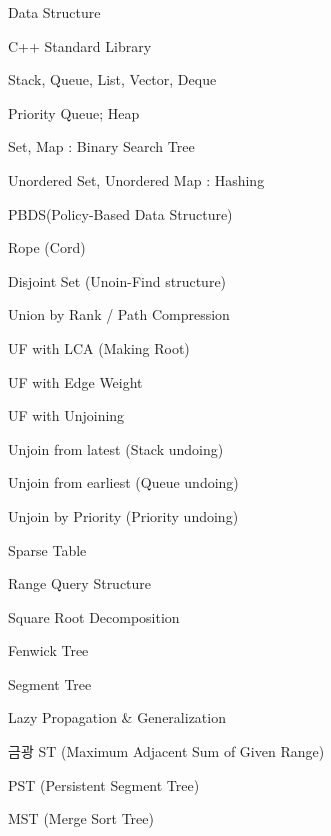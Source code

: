 \documentclass[landscape, 8pt, a4paper, oneside]{extarticle}
\begin{document}
\begin{multicols}{3}
\begin{tcolorbox}[breakable, enhanced, sharp corners, colback=white, colframe=black, boxrule=1pt, left=0pt]
\begin{IdeaNote}
\item Data Structure
    \begin{IdeaNote}
    \item C++ Standard Library
        \begin{IdeaNote}
        \item Stack, Queue, List, Vector, Deque
        \item Priority Queue; Heap
        \item Set, Map : Binary Search Tree
        \item Unordered Set, Unordered Map : Hashing
        \item PBDS(Policy-Based Data Structure)
        \item Rope (Cord)
        \end{IdeaNote}
    \item Disjoint Set (Unoin-Find structure)
        \begin{IdeaNote}
        \item Union by Rank / Path Compression
        \item UF with LCA (Making Root)
        \item UF with Edge Weight
        \item UF with Unjoining
            \begin{IdeaNote}
            \item Unjoin from latest (Stack undoing)
            \item Unjoin from earliest (Queue undoing)
            \item Unjoin by Priority (Priority undoing)
            \end{IdeaNote}
        \end{IdeaNote}
    \item Sparse Table
    \item Range Query Structure
        \begin{IdeaNote}
        \item Square Root Decomposition
        \item Fenwick Tree
        \item Segment Tree
            \begin{IdeaNote}
            \item Lazy Propagation \& Generalization
            \item 금광 ST (Maximum Adjacent Sum of Given Range)
            \item PST (Persistent Segment Tree)
            \item MST (Merge Sort Tree)

\end{IdeaNote}
\end{IdeaNote}
\end{IdeaNote}
\end{IdeaNote}
\end{tcolorbox}
\end{multicols}
\end{document}
